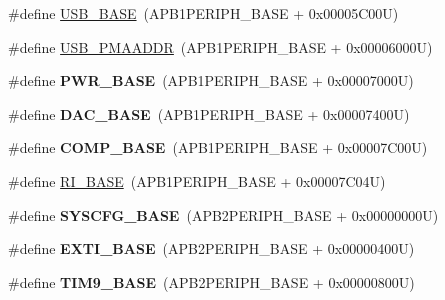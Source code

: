 \begin{DoxyCompactItemize}
\item 
\#define \hyperlink{group___peripheral__memory__map_gaa6c4cbed4ddbb3ecd77de93fab2a2e04}{U\-S\-B\-\_\-\-B\-A\-S\-E}~(A\-P\-B1\-P\-E\-R\-I\-P\-H\-\_\-\-B\-A\-S\-E + 0x00005\-C00\-U)
\item 
\#define \hyperlink{group___peripheral__memory__map_gaf992dfdd5707568c5cb5506e2347e808}{U\-S\-B\-\_\-\-P\-M\-A\-A\-D\-D\-R}~(A\-P\-B1\-P\-E\-R\-I\-P\-H\-\_\-\-B\-A\-S\-E + 0x00006000\-U)
\item 
\hypertarget{group___peripheral__memory__map_gac691ec23dace8b7a649a25acb110217a}{\#define {\bfseries P\-W\-R\-\_\-\-B\-A\-S\-E}~(A\-P\-B1\-P\-E\-R\-I\-P\-H\-\_\-\-B\-A\-S\-E + 0x00007000\-U)}\label{group___peripheral__memory__map_gac691ec23dace8b7a649a25acb110217a}

\item 
\hypertarget{group___peripheral__memory__map_gad18d0b914c7f68cecbee1a2d23a67d38}{\#define {\bfseries D\-A\-C\-\_\-\-B\-A\-S\-E}~(A\-P\-B1\-P\-E\-R\-I\-P\-H\-\_\-\-B\-A\-S\-E + 0x00007400\-U)}\label{group___peripheral__memory__map_gad18d0b914c7f68cecbee1a2d23a67d38}

\item 
\hypertarget{group___peripheral__memory__map_gaa9f5d2999c6918e385d7a526c4f6b1d3}{\#define {\bfseries C\-O\-M\-P\-\_\-\-B\-A\-S\-E}~(A\-P\-B1\-P\-E\-R\-I\-P\-H\-\_\-\-B\-A\-S\-E + 0x00007\-C00\-U)}\label{group___peripheral__memory__map_gaa9f5d2999c6918e385d7a526c4f6b1d3}

\item 
\#define \hyperlink{group___peripheral__memory__map_ga8fdc749e6f184b3cd9b01f179af62e4c}{R\-I\-\_\-\-B\-A\-S\-E}~(A\-P\-B1\-P\-E\-R\-I\-P\-H\-\_\-\-B\-A\-S\-E + 0x00007\-C04\-U)
\item 
\hypertarget{group___peripheral__memory__map_ga62246020bf3b34b6a4d8d0e84ec79d3d}{\#define {\bfseries S\-Y\-S\-C\-F\-G\-\_\-\-B\-A\-S\-E}~(A\-P\-B2\-P\-E\-R\-I\-P\-H\-\_\-\-B\-A\-S\-E + 0x00000000\-U)}\label{group___peripheral__memory__map_ga62246020bf3b34b6a4d8d0e84ec79d3d}

\item 
\hypertarget{group___peripheral__memory__map_ga87371508b3bcdcd98cd1ec629be29061}{\#define {\bfseries E\-X\-T\-I\-\_\-\-B\-A\-S\-E}~(A\-P\-B2\-P\-E\-R\-I\-P\-H\-\_\-\-B\-A\-S\-E + 0x00000400\-U)}\label{group___peripheral__memory__map_ga87371508b3bcdcd98cd1ec629be29061}

\item 
\hypertarget{group___peripheral__memory__map_ga92ae902be7902560939223dd765ece08}{\#define {\bfseries T\-I\-M9\-\_\-\-B\-A\-S\-E}~(A\-P\-B2\-P\-E\-R\-I\-P\-H\-\_\-\-B\-A\-S\-E + 0x00000800\-U)}\label{group___peripheral__memory__map_ga92ae902be7902560939223dd765ece08}


\end{DoxyCompactItemize}
